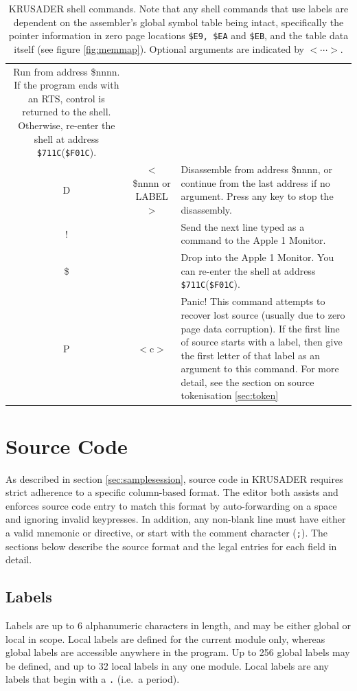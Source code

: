 \documentclass[12pt]{article}
\newcommand{\replica}[1]{\textsf{#1}}
\newcommand{\krusader}{\textsf{KRUSADER}\xspace}
\begin{document}
\begin{table}[p]
\begin{tabular}{|c|c|p{10cm}|}
									Run from address \replica{\$nnnn}.  If the
									program ends with an RTS, control is returned to the
									shell.  Otherwise, re-enter the shell at address
									\texttt{\$711C}(\texttt{\$F01C}).\tabularnewline
	\replica{D} & $<$\replica{\$nnnn} or \replica{LABEL}$>$ & Disassemble
									from address \replica{\$nnnn}, or continue from the last
									address if no argument. Press any key to stop the disassembly.\tabularnewline
	\replica{!} & & Send the next line typed as a command to the Apple 1 Monitor.\tabularnewline
	\replica{\$} & & Drop into the Apple 1 Monitor.  You can re-enter the shell at address
									\texttt{\$711C}(\texttt{\$F01C}).\tabularnewline
	\replica{P} & \replica{$<$c$>$} & Panic!  This command attempts to recover lost source
									(usually due to zero page data corruption).  If the first
									line of source starts with a label, then give the first
									letter of that label as an argument to this command.  For
									more detail, see the section on source tokenisation
									\ref{sec:token}\tabularnewline
	\hline
	\end{tabular}
	\caption{\krusader shell commands.  Note that any shell commands that use labels
	are dependent on the assembler's global symbol table being intact, specifically the pointer information
	in zero page locations \texttt{\$E9, \$EA} and \texttt{\$EB}, and the table data itself (see
	figure \ref{fig:memmap}). 	Optional arguments are indicated by $<\cdots>$.}
	\label{tab:shellcmds}
\end{table}
\section{Source Code}

As described in section \ref{sec:samplesession}, source code in \krusader requires strict adherence to a specific column-based format.
The editor both assists and enforces source code entry to match this format by auto-forwarding on a space and ignoring invalid keypresses.  In addition, any non-blank line must have either a valid mnemonic or directive, or start with the comment character (\texttt{;}).  The sections below describe the source format and the legal entries for each field in detail.

\subsection{Labels}
\label{sec:labels}

Labels are up to 6 alphanumeric characters in length, and may be either global or local in scope.  Local labels are defined for the current module only, whereas global labels are accessible anywhere in the program.  Up to 256 global labels may be defined, and up to 32 local labels in any one module.  Local labels are any labels that begin with a \texttt{.} (i.e.~a period).
\end{document}
